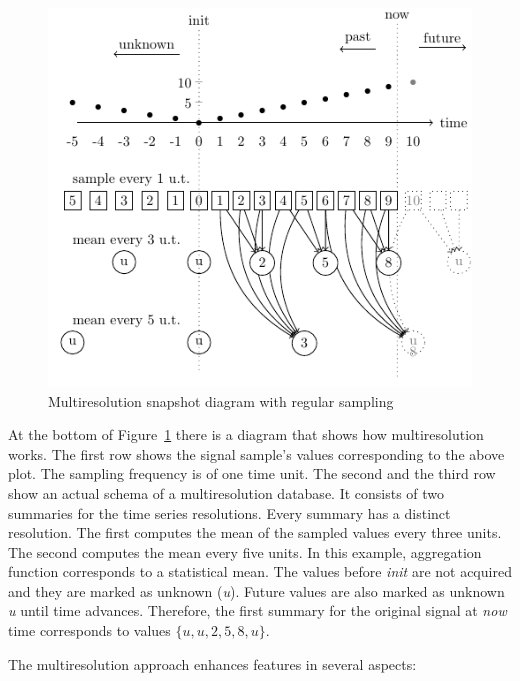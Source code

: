 \begin{figure}
  \centering
  \includegraphics{fig_mtsms_sequence.pdf}
  \caption{Multiresolution snapshot diagram with regular sampling}
  \label{fig:mtsms:sequence}
\end{figure}

At the bottom of Figure~\ref{fig:mtsms:sequence} there is a diagram
that shows how multiresolution works.
%
The first row shows the signal sample's values corresponding to the
above plot. The sampling frequency is of one time unit.
%
The second and the third row show an actual schema of a
multiresolution database. It consists of two summaries for the time
series resolutions. Every summary has a distinct resolution.
%
The first computes the mean of the sampled values every three units.
The second computes the mean every five units.
%
In this example, aggregation function corresponds to a statistical
mean. The values before \emph{init} are not acquired and they are
marked as unknown (\emph{u}). Future values are also marked as unknown
\emph{u} until time advances. Therefore, the first summary for the
original signal at \emph{now} time corresponds to values
$\{u,u,2,5,8,u\}$.


The multiresolution approach enhances  features in several
aspects:

